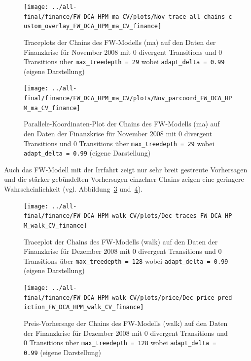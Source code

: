\documentclass[ngerman]{ttlab-qualify}
\begin{document}
\begin{figure}[h]%
    \begin{center}
    \texttt{[image: ../all-final/finance/FW\_DCA\_HPM\_ma\_CV/plots/Nov\_trace\_all\_chains\_custom\_overlay\_FW\_DCA\_HPM\_ma\_CV\_finance]}
    \caption{Traceplots der Chains des FW-Modells (ma) auf den Daten der Finanzkrise für November 2008 mit 0 divergent Transitions und 0 Transitions über \texttt{max\_treedepth  = 29} wobei \texttt{adapt\_delta = 0.99} (eigene Darstellung)}%
    \label{fig:FW-finance-nov-traces}%
\end{center}
\end{figure}

\begin{figure}[h]
\begin{center}
\texttt{[image: ../all-final/finance/FW\_DCA\_HPM\_ma\_CV/plots/Nov\_parcoord\_FW\_DCA\_HPM\_ma\_CV\_finance]} 
\caption{Parallele-Koordinaten-Plot der Chains des FW-Modells (ma) auf den Daten der Finanzkrise für November 2008 mit 0 divergent Transitions und 0 Transitions über \texttt{max\_treedepth  = 29} wobei \texttt{adapt\_delta = 0.99} (eigene Darstellung)}
\label{fig:FW-finance-nov-parcoord}
\end{center}
\end{figure}

Auch das FW-Modell mit der Irrfahrt zeigt nur sehr breit gestreute Vorhersagen und die stärker gebündelten Vorhersagen einzelner Chains zeigen eine geringere Wahrscheinlichkeit (vgl. Abbildung~\ref{fig:FW-finance-dec-traces-all-chains} und~\ref{fig:FW-finance-dec-price}).

\begin{figure}[H]
\begin{center}
\texttt{[image: ../all-final/finance/FW\_DCA\_HPM\_walk\_CV/plots/Dec\_traces\_FW\_DCA\_HPM\_walk\_CV\_finance]} 
\caption{Traceplot der Chains des FW-Modells (walk) auf den Daten der Finanzkrise für Dezember 2008 mit 0 divergent Transitions und 0 Transitions über \texttt{max\_treedepth  = 128} wobei \texttt{adapt\_delta = 0.99} (eigene Darstellung)}
\label{fig:FW-finance-dec-traces-all-chains}
\end{center}
\end{figure}

\begin{figure}[H]
\begin{center}
\texttt{[image: ../all-final/finance/FW\_DCA\_HPM\_walk\_CV/plots/price/Dec\_price\_prediction\_FW\_DCA\_HPM\_walk\_CV\_finance]}
\caption{Preis-Vorhersage der Chains des FW-Modells (walk) auf den Daten der Finanzkrise für Dezember 2008 mit 0 divergent Transitions und 0 Transitions über \texttt{max\_treedepth  = 128} wobei \texttt{adapt\_delta = 0.99} (eigene Darstellung)}
\label{fig:FW-finance-dec-price}
\end{center}
\end{figure}
\end{document}
